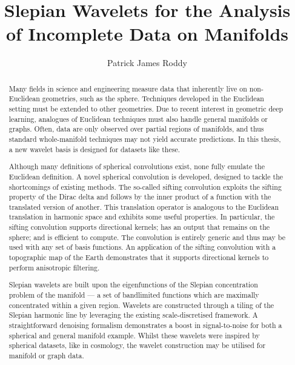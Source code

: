 
\title{Slepian Wavelets for the Analysis of Incomplete Data on Manifolds}
\author{Patrick James Roddy}

\maketitle
\makedeclaration{}

\begin{abstract} %
	Many fields in science and engineering measure data that inherently live on non-Euclidean geometries, such as the sphere.
	Techniques developed in the Euclidean setting must be extended to other geometries.
	Due to recent interest in geometric deep learning, analogues of Euclidean techniques must also handle general manifolds or graphs.
	Often, data are only observed over partial regions of manifolds, and thus standard whole-manifold techniques may not yield accurate predictions.
	In this thesis, a new wavelet basis is designed for datasets like these.

	Although many definitions of spherical convolutions exist, none fully emulate the Euclidean definition.
	A novel spherical convolution is developed, designed to tackle the shortcomings of existing methods.
	The so-called sifting convolution exploits the sifting property of the Dirac delta and follows by the inner product of a function with the translated version of another.
	This translation operator is analogous to the Euclidean translation in harmonic space and exhibits some useful properties.
	In particular, the sifting convolution supports directional kernels; has an output that remains on the sphere; and is efficient to compute.
	The convolution is entirely generic and thus may be used with any set of basis functions.
	An application of the sifting convolution with a topographic map of the Earth demonstrates that it supports directional kernels to perform anisotropic filtering.

	Slepian wavelets are built upon the eigenfunctions of the Slepian concentration problem of the manifold --- a set of bandlimited functions which are maximally concentrated within a given region.
	Wavelets are constructed through a tiling of the Slepian harmonic line by leveraging the existing scale-discretised framework.
	A straightforward denoising formalism demonstrates a boost in signal-to-noise for both a spherical and general manifold example.
	Whilst these wavelets were inspired by spherical datasets, like in cosmology, the wavelet construction may be utilised for manifold or graph data.
\end{abstract}

